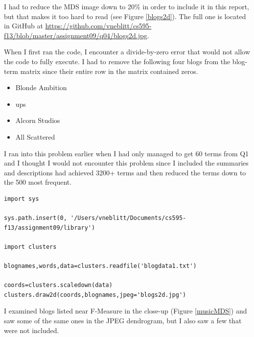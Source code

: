 \documentclass{article}
\begin{document}
I had to reduce the MDS image down to 20\% in order to include it in this report, but that makes it too hard to read (see Figure \ref{blogs2d}). The full one is located in GitHub at \url{https://github.com/vneblitt/cs595-f13/blob/master/assignment09/q04/blogs2d.jpg}.

When I first ran the code, I encounter a divide-by-zero error that would not allow the code to fully execute. I had to remove the following four blogs from the blog-term matrix since their entire row in the matrix contained zeros.

\begin{itemize}
\item Blonde Ambition
\item ups
\item Alcorn Studios
\item All Scattered
\end{itemize}

I ran into this problem earlier when I had only managed to get 60 terms from Q1 and I thought I would not encounter this problem since I included the summaries and descriptions had achieved 3200+ terms and then reduced the terms down to the 500 most frequent.

\begin{lstlisting}[frame=single, caption=getMDS.py, label=getMDS]
import sys

sys.path.insert(0, '/Users/vneblitt/Documents/cs595-f13/assignment09/library')

import clusters

blognames,words,data=clusters.readfile('blogdata1.txt')

coords=clusters.scaledown(data)
clusters.draw2d(coords,blognames,jpeg='blogs2d.jpg')
\end{lstlisting}

I examined blogs listed near F-Measure in the close-up (Figure \ref{musicMDS}) and saw some of the same ones in the JPEG dendrogram, but I also saw a few that were not included.
\end{document}
